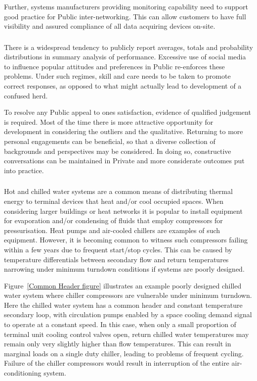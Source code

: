 \documentclass[11pt, oneside]{book}   	%
\begin{document}
Further, systems manufacturers providing monitoring capability need to support good practice for Public inter-networking.
This can allow customers to have full visibility and assured compliance of all data acquiring devices on-site.\

\subsubsection{\color{Red}{P1: Social Media and Influencing the Averages}}
There is a widespread tendency to publicly report averages, totals and probability distributions in summary analysis of performance.
Excessive use of social media to influence popular attitudes and preferences in Public re-enforces these problems.
Under such regimes, skill and care needs to be taken to promote correct responses, as opposed to what might actually lead to development of a confused herd.\

To resolve any Public appeal to ones satisfaction, evidence of qualified judgement is required.
Most of the time there is more attractive opportunity for development in considering the outliers and the qualitative.
Returning to more personal engagements can be beneficial, so that a diverse collection of backgrounds and perspectives may be considered.
In doing so, constructive conversations can be maintained in Private and more considerate outcomes put into practice.\

\subsubsection{\color{Red}{P1: Compressor Failures under Minimum Turndown}}
Hot and chilled water systems are a common means of distributing thermal energy to terminal devices that heat and/or cool occupied spaces.
When considering larger buildings or heat networks it is popular to install equipment for evaporation and/or condensing of fluids that employ compressors for pressurisation.
Heat pumps and air-cooled chillers are examples of such equipment.
However, it is becoming common to witness such compressors failing within a few years due to frequent start/stop cycles.
This can be caused by temperature differentials between secondary flow and return temperatures narrowing under minimum turndown conditions if systems are poorly designed.\

Figure~\ref{Common Header figure} illustrates an example poorly designed chilled water system where chiller compressors are vulnerable under minimum turndown.
Here the chilled water system has a common header and constant temperature secondary loop, with circulation pumps enabled by a space cooling demand signal to operate at a constant speed.
In this case, when only a small proportion of terminal unit cooling control valves open, return chilled water temperatures may remain only very slightly higher than flow temperatures.
This can result in marginal loads on a single duty chiller, leading to problems of frequent cycling.
Failure of the chiller compressors would result in interruption of the entire air-conditioning system.\
\end{document}

